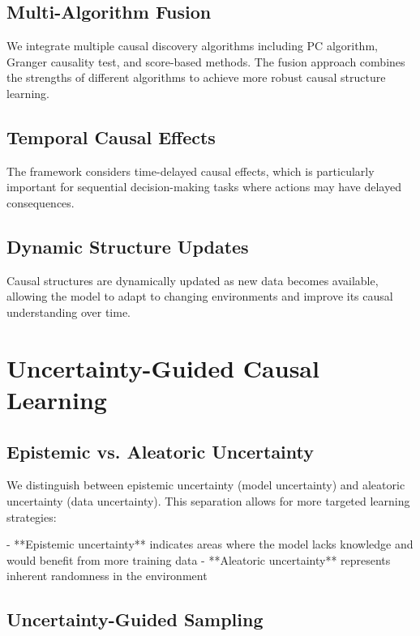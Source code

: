 \documentclass[12pt]{article}
\begin{document}
\subsection{Multi-Algorithm Fusion}

We integrate multiple causal discovery algorithms including PC algorithm, Granger causality test, and score-based methods. The fusion approach combines the strengths of different algorithms to achieve more robust causal structure learning.

\subsection{Temporal Causal Effects}

The framework considers time-delayed causal effects, which is particularly important for sequential decision-making tasks where actions may have delayed consequences.

\subsection{Dynamic Structure Updates}

Causal structures are dynamically updated as new data becomes available, allowing the model to adapt to changing environments and improve its causal understanding over time.

\section{Uncertainty-Guided Causal Learning}

\subsection{Epistemic vs. Aleatoric Uncertainty}

We distinguish between epistemic uncertainty (model uncertainty) and aleatoric uncertainty (data uncertainty). This separation allows for more targeted learning strategies:

- **Epistemic uncertainty** indicates areas where the model lacks knowledge and would benefit from more training data
- **Aleatoric uncertainty** represents inherent randomness in the environment

\subsection{Uncertainty-Guided Sampling}
\end{document}
